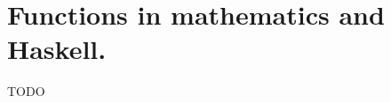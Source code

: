 \section{ Functions in mathematics and Haskell. }

TODO %
\inputminted[firstline=7,
             lastline=20,
             fontsize=\footnotesize, tabsize=4]{haskell}{ps1.hs}
             